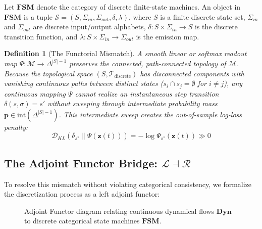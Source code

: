 \documentclass[11pt,a4paper]{article}
\newtheorem{definition}{Definition}
\begin{document}
Let $\mathbf{FSM}$ denote the category of discrete finite-state machines. An object in $\mathbf{FSM}$ is a tuple $\mathcal{S} = (S, \Sigma_{in}, \Sigma_{out}, \delta, \lambda)$, where $S$ is a finite discrete state set, $\Sigma_{in}$ and $\Sigma_{out}$ are discrete input/output alphabets, $\delta: S \times \Sigma_{in} \to S$ is the discrete transition function, and $\lambda: S \times \Sigma_{in} \to \Sigma_{out}$ is the emission map.

\begin{definition}[The Functorial Mismatch]
A smooth linear or softmax readout map $\Psi: \mathcal{M} \to \Delta^{|S|-1}$ preserves the connected, path-connected topology of $\mathcal{M}$. Because the topological space $(S, \mathcal{T}_{\text{discrete}})$ has disconnected components with vanishing continuous paths between distinct states ($s_i \cap s_j = \emptyset$ for $i \neq j$), any continuous mapping $\Psi$ cannot realize an instantaneous step transition $\delta(s, \sigma) = s'$ without sweeping through intermediate probability mass $\mathbf{p} \in \text{int}(\Delta^{|S|-1})$. This intermediate sweep creates the out-of-sample log-loss penalty:
\begin{equation}
\mathcal{D}_{KL}( \delta_{s^*} \parallel \Psi(\mathbf{z}(t)) ) = -\log \Psi_{s^*}(\mathbf{z}(t)) \gg 0
\end{equation}
\end{definition}

\subsection{The Adjoint Functor Bridge: $\mathcal{L} \dashv \mathcal{R}$}
To resolve this mismatch without violating categorical consistency, we formalize the discretization process as a left adjoint functor:

\begin{figure}[H]
\centering
{}
\caption{Adjoint Functor diagram relating continuous dynamical flows $\mathbf{Dyn}$ to discrete categorical state machines $\mathbf{FSM}$.}
\label{fig:adjunction}
\end{figure}
\end{document}
